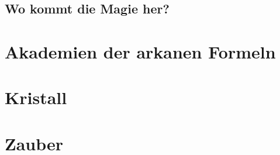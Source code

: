 \documentclass[10pt,a4paper,twocolumn,openany]{book}
\begin{document}
\section{Wo kommt die Magie her?}

\chapter{Akademien der arkanen Formeln}

\chapter{Kristall}


\chapter{Zauber}





\rpgMakeMap[
image = Bilder/cover%
]
\end{document}
